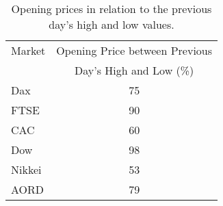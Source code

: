 \begin{table}[!htbp] \centering 
  \caption[Opening Prices in relation to previous day's High and Low values]{Opening prices in relation to the previous day's high and low values.} 
  \label{tab:openprices}
\begin{tabular}{lc} 
\toprule 
Market & Opening Price between Previous   \\ 
       &  Day's High and Low (\%) \\
\midrule 
Dax & 75 \\ 
FTSE & 90  \\ 
CAC & 60  \\ 
Dow & 98 \\ 
Nikkei & 53 \\ 
AORD & 79\\ 
\bottomrule 
\end{tabular} 
\end{table} 


